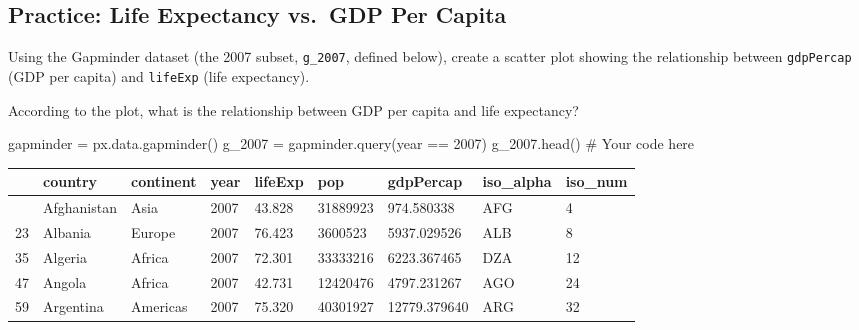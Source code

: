 \documentclass[
  letterpaper,
  DIV=11,
  numbers=noendperiod]{scrreprt}
\newenvironment{Shaded}{\begin{snugshade}}{\end{snugshade}}
\newcommand{\CommentTok}[1]{\textcolor[rgb]{0.37,0.37,0.37}{#1}}
\newcommand{\NormalTok}[1]{\textcolor[rgb]{0.00,0.23,0.31}{#1}}
\newcommand{\OperatorTok}[1]{\textcolor[rgb]{0.37,0.37,0.37}{#1}}
\newcommand{\StringTok}[1]{\textcolor[rgb]{0.13,0.47,0.30}{#1}}
\begin{document}
\begin{tcolorbox}[enhanced jigsaw, colframe=quarto-callout-tip-color-frame, opacityback=0, titlerule=0mm, bottomrule=.15mm, breakable, leftrule=.75mm, colbacktitle=quarto-callout-tip-color!10!white, title=\textcolor{quarto-callout-tip-color}{\faLightbulb}\hspace{0.5em}{Practice}, rightrule=.15mm, coltitle=black, opacitybacktitle=0.6, colback=white, left=2mm, arc=.35mm, toptitle=1mm, bottomtitle=1mm, toprule=.15mm]

\subsection{Practice: Life Expectancy vs.~GDP Per
Capita}\label{practice-life-expectancy-vs.-gdp-per-capita}

Using the Gapminder dataset (the 2007 subset, \texttt{g\_2007}, defined
below), create a scatter plot showing the relationship between
\texttt{gdpPercap} (GDP per capita) and \texttt{lifeExp} (life
expectancy).

According to the plot, what is the relationship between GDP per capita
and life expectancy?

\begin{Shaded}
\begin{Highlighting}[]
\NormalTok{gapminder }\OperatorTok{=}\NormalTok{ px.data.gapminder()}
\NormalTok{g\_2007 }\OperatorTok{=}\NormalTok{ gapminder.query(}\StringTok{\textquotesingle{}year == 2007\textquotesingle{}}\NormalTok{)}
\NormalTok{g\_2007.head()}
\CommentTok{\# Your code here}
\end{Highlighting}
\end{Shaded}

\begin{longtable}[]{@{}lllllllll@{}}
\toprule\noalign{}
& country & continent & year & lifeExp & pop & gdpPercap & iso\_alpha &
iso\_num \\
\midrule\noalign{}
\endhead
\bottomrule\noalign{}
\endlastfoot
11 & Afghanistan & Asia & 2007 & 43.828 & 31889923 & 974.580338 & AFG &
4 \\
23 & Albania & Europe & 2007 & 76.423 & 3600523 & 5937.029526 & ALB &
8 \\
35 & Algeria & Africa & 2007 & 72.301 & 33333216 & 6223.367465 & DZA &
12 \\
47 & Angola & Africa & 2007 & 42.731 & 12420476 & 4797.231267 & AGO &
24 \\
59 & Argentina & Americas & 2007 & 75.320 & 40301927 & 12779.379640 &
ARG & 32 \\
\end{longtable}

\end{tcolorbox}
\end{document}
